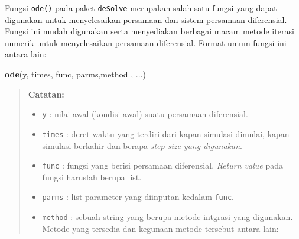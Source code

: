 \documentclass[]{book}
\newenvironment{Shaded}{\begin{snugshade}}{\end{snugshade}}
\newcommand{\KeywordTok}[1]{\textcolor[rgb]{0.13,0.29,0.53}{\textbf{#1}}}
\newcommand{\NormalTok}[1]{#1}
\theoremstyle{definition}
\theoremstyle{definition}
\theoremstyle{definition}
\theoremstyle{remark}
\begin{document}
Fungsi \texttt{ode()} pada paket \texttt{deSolve} merupakan salah satu fungsi yang dapat digunakan untuk menyelesaikan persamaan dan sistem persamaan diferensial. Fungsi ini mudah digunakan serta menyediakan berbagai macam metode iterasi numerik untuk menyelesaikan persamaan diferensial. Format umum fungsi ini antara lain:

\begin{Shaded}
\begin{Highlighting}[]
\KeywordTok{ode}\NormalTok{(y, times, func, parms,method , ...)}
\end{Highlighting}
\end{Shaded}

\begin{quote}
\textbf{Catatan:}

\begin{itemize}
\item
  \texttt{y} : nilai awal (kondisi awal) suatu persamaan diferensial.
\item
  \texttt{times} : deret waktu yang terdiri dari kapan simulasi dimulai, kapan simulasi berkahir dan berapa \emph{step size yang digunakan}.
\item
  \texttt{func} : fungsi yang berisi persamaan diferensial. \emph{Return value} pada fungsi haruslah berupa list.
\item
  \texttt{parms} : list parameter yang diinputan kedalam \texttt{func}.
\item
  \texttt{method} : sebuah string yang berupa metode intgrasi yang digunakan. Metode yang tersedia dan kegunaan metode tersebut antara lain:


\end{itemize}
\end{quote}
\end{document}
